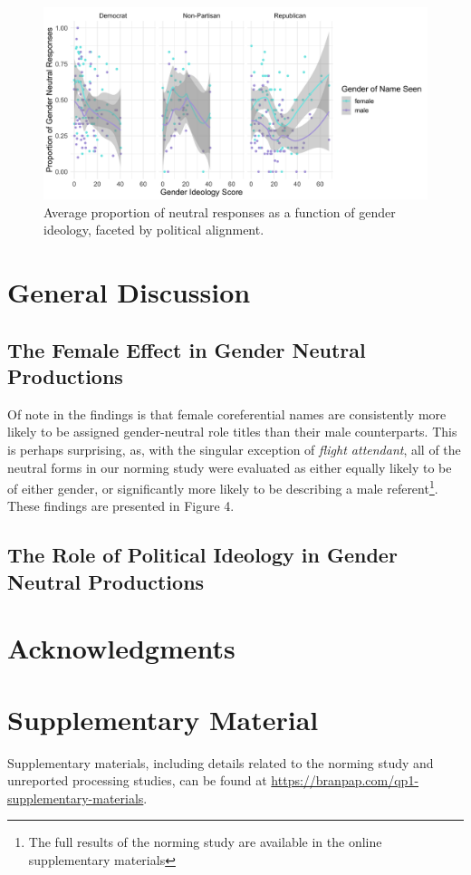 \documentclass[10pt,letterpaper]{article}
\begin{document}
	\begin{figure}[ht!]
	\centering
	\includegraphics[scale=0.15]{prod_neutral_poli.png}
	\caption{Average proportion of neutral responses as a function of gender ideology, faceted by political alignment.}
	\label{prod-neutral-poli}
\end{figure}
	\section{General Discussion}
	
	\subsection{The Female Effect in Gender Neutral Productions}
	Of note in the findings is that female coreferential names are consistently more likely to be assigned gender-neutral role titles than their male counterparts. This is perhaps surprising, as, with the singular exception of \textit{flight attendant}, all of the neutral forms in our norming study were evaluated as either equally likely to be of either gender, or significantly more likely to be describing a male referent\footnote{The full results of the norming study are available in the online supplementary materials}. These findings are presented in Figure 4.
	
	\subsection{The Role of Political Ideology in Gender Neutral Productions}
	
	\section{Acknowledgments}
	
	\section{Supplementary Material}
		Supplementary materials, including details related to the norming study and unreported processing studies, can be found at \url{https://branpap.com/qp1-supplementary-materials}.
		
	\nocite{labov1963social}
	\printbibliography
	
	
\end{document}
